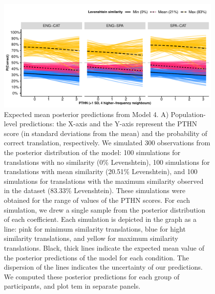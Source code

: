 \documentclass[
  english,
  man,floatsintext]{apa7}
\begin{document}
\begin{figure}
\centering
\includegraphics{manuscript_files/figure-latex/marginaleffects-1.pdf}
\caption{\label{fig:marginaleffects}Expected mean posterior predictions from Model 4. A) Population-level predictions: the X-axis and the Y-axis represent the PTHN score (in standard deviations from the mean) and the probability of correct translation, respectively. We simulated 300 observations from the posterior distribution of the model: 100 simulations for translations with no similarity (0\% Levenshtein), 100 simulations for translations with mean similarity (20.51\% Levenshtein), and 100 simulations for translations with the maximum similarity observed in the dataset (83.33\% Levenshtein). These simulations were obtained for the range of values of the PTHN scores. For each simulation, we drew a single sample from the posterior distribution of each coefficient. Each simulation is depicted in the graph as a line: pink for minimum similarity translations, blue for hight similarity translations, and yellow for maximum similarity translations. Black, thick lines indicate the expected mean value of the posterior predictions of the model for each condition. The dispersion of the lines indicates the uncertainty of our predictions. We computed these posterior predictions for each group of participants, and plot tem in separate panels.}
\end{figure}
\end{document}
